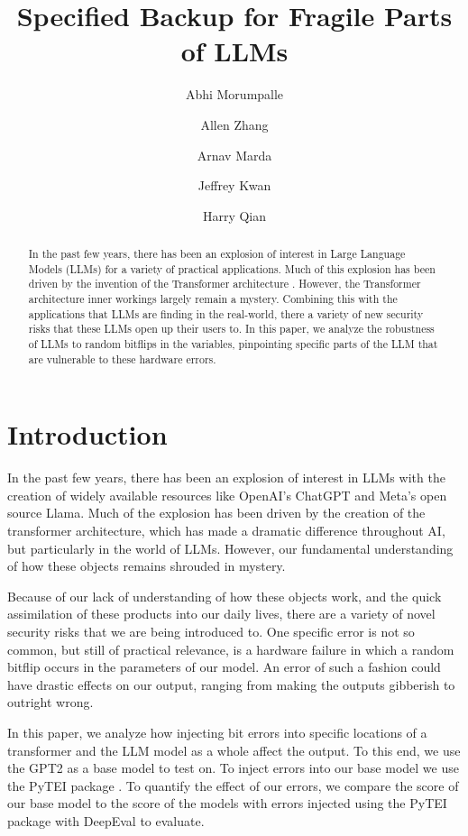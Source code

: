 \documentclass[a4paper]{article}
\title{Specified Backup for Fragile Parts of LLMs}
\author{
Abhi Morumpalle
\and
Allen Zhang
\and
Arnav Marda
\and
Jeffrey Kwan
\and
Harry Qian
}
\begin{document}
\maketitle

\begin{abstract}
In the past few years, there has been an explosion of interest in Large Language Models (LLMs) for a variety of practical applications. Much of this explosion has been driven by the invention of the Transformer architecture \cite{Vaswani17}. However, the Transformer architecture inner workings largely remain a mystery. Combining this with the applications that LLMs are finding in the real-world, there a variety of new security risks that these LLMs open
up their users to. In this paper, we analyze the robustness of LLMs to random bitflips in the variables, pinpointing specific parts of the LLM that are vulnerable to these hardware errors.


\end{abstract}


\section{Introduction}

In the past few years, there has been an explosion of interest in LLMs with the creation of widely available resources like OpenAI's ChatGPT
and Meta's open source Llama. Much of the explosion has been driven by the creation of the transformer architecture, which has made a dramatic difference throughout AI, but particularly in the world of LLMs. However, our fundamental understanding of how these objects remains shrouded in mystery.

Because of our lack of understanding of how these objects work, and the quick assimilation of these products into our daily lives, there are a variety of novel security risks that we are being introduced to. One specific error is not so common, but still of practical relevance, is a hardware failure in which a random bitflip occurs in the parameters of our model. An error of such a fashion could have drastic effects on our output, ranging from making the outputs gibberish to outright wrong.

In this paper, we analyze how injecting bit errors into specific locations of a transformer and the LLM model as a whole affect the output. To this end, we use the GPT2 as a base model to test on. To inject errors into our base model we use the PyTEI package \cite{Ma23}. To quantify the effect of our errors, we compare the score of our base model to the score of the models with errors injected using the PyTEI package with DeepEval to evaluate.
\end{document}
